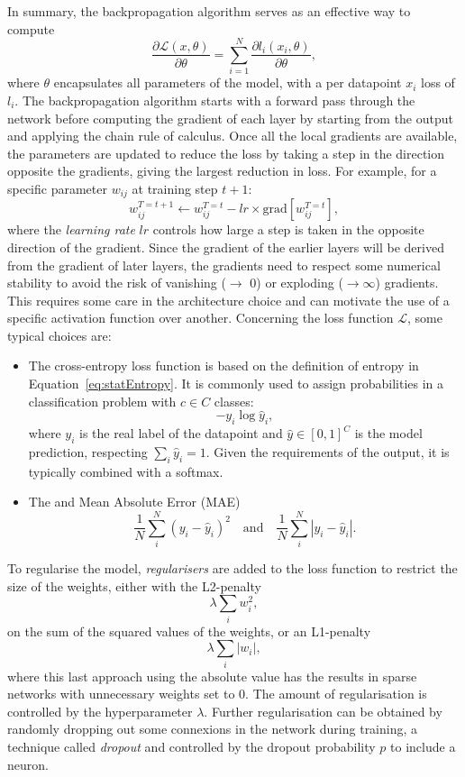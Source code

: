 In summary, the backpropagation algorithm serves as an effective way to compute \[ \frac{\partial\mathcal{L}(x, \theta)}{\partial\theta} = \sum_{i=1}^N \frac{\partial l_i(x_i, \theta)}{\partial\theta},\] where $\theta$ encapsulates all parameters of the model, with a per datapoint $x_i$ loss of $l_i$. The backpropagation algorithm starts with a forward pass through the network before computing the gradient of each layer by starting from the output and applying the chain rule of calculus. Once all the local gradients are available, the parameters are updated to reduce the loss by taking a step in the direction opposite the gradients, giving the largest reduction in loss. For example, for a specific parameter $w_{ij}$ at training step $t+1$:
\begin{equation}\label{eq:gradientdescent}
    w^{T=t+1}_{ij} \leftarrow w^{T=t}_{ij} - lr \times \text{grad}\left[w^{T=t}_{ij}\right],
\end{equation}
where the \textit{learning rate} $lr$ controls how large a step is taken in the opposite direction of the gradient. Since the gradient of the earlier layers will be derived from the gradient of later layers, the gradients need to respect some numerical stability to avoid the risk of vanishing ($\rightarrow$ 0) or exploding ($\rightarrow \infty$) gradients. This requires some care in the architecture choice and can motivate the use of a specific activation function over another. Concerning the loss function $\mathcal{L}$, some typical choices are:
\begin{itemize}
    \item The cross-entropy loss function is based on the definition of entropy in Equation~\ref{eq:statEntropy}. It is commonly used to assign probabilities in a classification problem with $c \in C$ classes: \[ -y_i \log\hat{y}_i,\] where $y_i$ is the real label of the datapoint and $\hat{y} \in [0, 1]^C$ is the model prediction, respecting $\sum_i \hat{y}_i = 1$. Given the requirements of the output, it is typically combined with a softmax. 
    \item The  and Mean Absolute Error (MAE) \[\frac{1}{N}\sum_i^N (y_i - \hat{y}_i)^2 \quad \text{and} \quad \frac{1}{N}\sum_i^N |y_i - \hat{y}_i|.\] 
\end{itemize} 
To regularise the model, \textit{regularisers} are added to the loss function to restrict the size of the weights, either with the L2-penalty \[\lambda \sum_i w_i^2,\] on the sum of the squared values of the weights, or an L1-penalty \[\lambda \sum_i |w_i|,\] where this last approach using the absolute value has the results in sparse networks with unnecessary weights set to 0. The amount of regularisation is controlled by the hyperparameter $\lambda$. Further regularisation can be obtained by randomly dropping out some connexions in the network during training, a technique called \textit{dropout} and controlled by the dropout probability $p$ to include a neuron.

